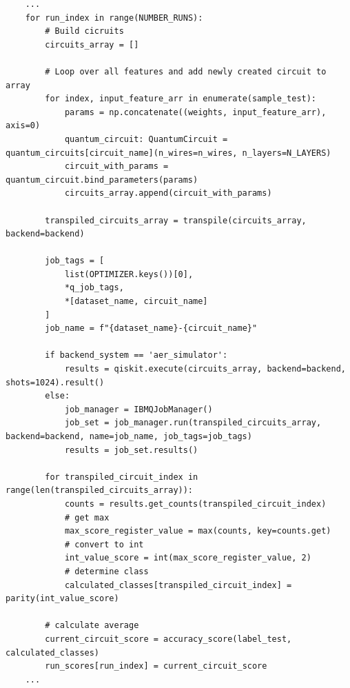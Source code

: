 \begin{listing}[!ht]
    \begin{verbatim}
    ...
    for run_index in range(NUMBER_RUNS):
        # Build cicruits
        circuits_array = []

        # Loop over all features and add newly created circuit to array
        for index, input_feature_arr in enumerate(sample_test):
            params = np.concatenate((weights, input_feature_arr), axis=0)
            quantum_circuit: QuantumCircuit = quantum_circuits[circuit_name](n_wires=n_wires, n_layers=N_LAYERS)
            circuit_with_params = quantum_circuit.bind_parameters(params)
            circuits_array.append(circuit_with_params)

        transpiled_circuits_array = transpile(circuits_array, backend=backend)

        job_tags = [
            list(OPTIMIZER.keys())[0],
            *q_job_tags,
            *[dataset_name, circuit_name]
        ]
        job_name = f"{dataset_name}-{circuit_name}"

        if backend_system == 'aer_simulator':
            results = qiskit.execute(circuits_array, backend=backend, shots=1024).result()
        else:
            job_manager = IBMQJobManager()
            job_set = job_manager.run(transpiled_circuits_array, backend=backend, name=job_name, job_tags=job_tags)
            results = job_set.results()

        for transpiled_circuit_index in range(len(transpiled_circuits_array)):
            counts = results.get_counts(transpiled_circuit_index)
            # get max
            max_score_register_value = max(counts, key=counts.get)
            # convert to int
            int_value_score = int(max_score_register_value, 2)
            # determine class
            calculated_classes[transpiled_circuit_index] = parity(int_value_score)

        # calculate average
        current_circuit_score = accuracy_score(label_test, calculated_classes)
        run_scores[run_index] = current_circuit_score
    ...
    \end{verbatim}
    \caption{Python code snippet showing the  for loop where the new circuits are created and bound to the pre-trained  and to each  feature using the concatenated  array on line 10. Further the  is then executed using the  on line 26. The resulting measurement is evaluated and the label determined using the  function on line 30-36. Finally the accuracy score is calculated over all of the 10 runs on line 39 using the \footnote{\url{https://scikit-learn.org/stable/modules/generated/sklearn.metrics.accuracy_score.html}} from \cite{scikit-learn}.}
    \label{listing:evaluation_loop_example}
\end{listing}

